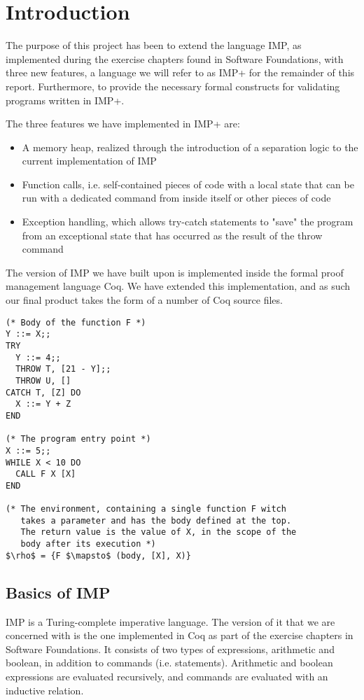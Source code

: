 
\section{Introduction}
The purpose of this project has been to extend the language IMP, as implemented during the exercise chapters found in Software Foundations, with three new features, a language we will refer to as IMP+ for the remainder of this report. Furthermore, to provide the necessary formal constructs for validating programs written in IMP+.

The three features we have implemented in IMP+ are:
\begin{itemize}
\item A memory heap, realized through the introduction of a separation logic to the current implementation of IMP
\item Function calls, i.e. self-contained pieces of code with a local state that can be run with a dedicated command from inside itself or other pieces of code
\item Exception handling, which allows try-catch statements to "save" the program from an exceptional state that has occurred as the result of the throw command
\end{itemize}

The version of IMP we have built upon is implemented inside the formal proof management language Coq. We have extended this implementation, and as such our final product takes the form of a number of Coq source files.

\begin{lstlisting}[mathescape=true,keepspaces=true,label=lst:imp-plus-ex,caption=A program written in IMP+ demonstrating assignment and throw/catch.]
(* Body of the function F *)
Y ::= X;;
TRY
  Y ::= 4;;
  THROW T, [21 - Y];;
  THROW U, []
CATCH T, [Z] DO
  X ::= Y + Z
END

(* The program entry point *)
X ::= 5;;
WHILE X < 10 DO
  CALL F X [X]
END

(* The environment, containing a single function F witch
   takes a parameter and has the body defined at the top.
   The return value is the value of X, in the scope of the 
   body after its execution *)
$\rho$ = {F $\mapsto$ (body, [X], X)}
\end{lstlisting}

\subsection{Basics of IMP}
IMP is a Turing-complete imperative language. The version of it that we are concerned with is the one implemented in Coq as part of the exercise chapters in Software Foundations. It consists of two types of expressions, arithmetic and boolean, in addition to commands (i.e. statements). Arithmetic and boolean expressions are evaluated recursively, and commands are evaluated with an inductive relation.

